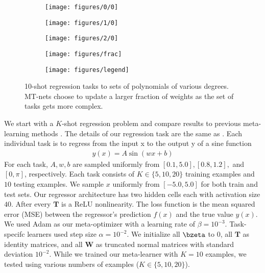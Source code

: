 \documentclass{article}
\newcommand{\W}{\mathbf{W}}
\newcommand{\T}{\mathbf{T}}
\newcommand{\logit}{\bzeta}
\begin{document}
\begin{figure*}[t]
\begin{subfigure}{.5\columnwidth}
  \centering
  \texttt{[image: figures/0/0]}
\end{subfigure}%
\begin{subfigure}{.5\columnwidth}
  \centering
  \texttt{[image: figures/1/0]}
\end{subfigure}%
\begin{subfigure}{.5\columnwidth}
  \centering
  \texttt{[image: figures/2/0]}
\end{subfigure}%
\begin{subfigure}{.5\columnwidth}
  \centering
  \texttt{[image: figures/frac]}
\end{subfigure}%

\begin{subfigure}{2\columnwidth}
  \texttt{[image: figures/legend]}
\end{subfigure}%
\caption{
10-shot regression tasks to sets of polynomials of various degrees.
MT-nets choose to update a larger fraction of weights as the set of tasks gets more complex.
}
\end{figure*}
We start with a $K$-shot regression problem and compare results to previous meta-learning methods \cite{FinnC2017icml, Li2017arxiv}.
The details of our regression task are the same as \cite{Li2017arxiv}.
Each individual task is to regress from the input x to the output y of a sine function
\begin{align}
y(x) = A \sin (wx + b)
\end{align}
For each task, $A,w,b$ are sampled uniformly from $[0.1,5.0], [0.8,1.2],$ and $[0,\pi]$, respectively.
Each task consists of $K \in \{5, 10, 20\}$ training examples and $10$ testing examples.
We sample $x$ uniformly from $[-5.0, 5.0]$ for both train and test sets.
Our regressor architecture has two hidden cells each with activation size $40$.
After every $\T$ is a ReLU nonlinearity.
The loss function is the mean squared error (MSE) between the regressor's prediction $f(x)$ and the true value $y(x)$.
We used Adam \cite{KingmaDP2015iclr} as our meta-optimizer with a learning rate of $\beta=10^{-3}$.
Task-specifc learners used step size $\alpha=10^{-2}$.
We initialize all $\logit$ to $0$, all $\T$ as identity matrices, and all $\W$ as truncated normal matrices with standard deviation $10^{-2}$.
While we trained our meta-learner with $K=10$ examples, we tested using various numbers of examples ($K \in \{5, 10, 20\}$).
\end{document}
